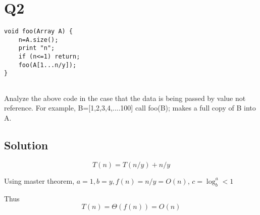 
\section*{Q2}

\begin{lstlisting}
void foo(Array A) {
    n=A.size();
    print "n";
    if (n<=1) return;
    foo(A[1...n/y]);
}
        
\end{lstlisting}

Analyze the above code in the case that the data is being passed by value not reference.
For example, B=[1,2,3,4,....100] call foo(B); makes a full copy of B into A.

\subsection*{Solution}

$$T(n) = T(n/y) + n/y$$

Using master theorem, $a = 1, b = y, f(n) = n/y = O(n)$, $c = \log_b^a < 1$

Thus $$T(n) = \Theta(f(n)) = O(n)$$